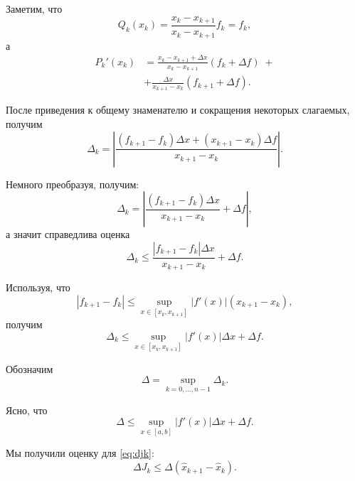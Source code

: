 \documentclass[10pt, twocolumn]{article}
\begin{document}
Заметим, что
\begin{equation*}
  Q_k(x_k) = \frac{x_k - x_{k + 1}}{x_k - x_{k + 1}} f_k  = f_k,
\end{equation*}
а
\begin{align*}
  P_k'(x_k) &= \frac{x_k - x_{k + 1} + \Delta x}{x_k - x_{k + 1}} (f_k + \Delta f) \; +\\
            &+ \frac{\Delta x}{x_{k + 1} - x_k} (f_{k + 1} + \Delta f).
\end{align*}

После приведения к общему знаменателю и сокращения некоторых слагаемых, получим
\begin{equation*}
  \Delta_k = \left| \frac{(f_{k + 1} - f_{k}) \Delta x + (x_{k + 1} - x_k) \Delta f}{x_{k + 1} - x_k} \right|.
\end{equation*}

Немного преобразуя, получим:
\begin{equation*}
  \Delta_k = \left| \frac{(f_{k + 1} - f_{k}) \Delta x}{x_{k + 1} - x_k} + \Delta f \right|,
\end{equation*}
а значит справедлива оценка
\begin{equation*}
  \Delta_k \leq \frac{\left| f_{k + 1} - f_{k} \right| \Delta x}{x_{k + 1} - x_k} + \Delta f.
\end{equation*}

Используя, что
\begin{equation*}
  \left| f_{k + 1} - f_{k} \right| \leq \sup \limits_{x \in [x_k, x_{k + 1}]} \left| f'(x) \right| (x_{k + 1} - x_k),
\end{equation*}
получим
\begin{equation*}
  \Delta_k \leq \sup \limits_{x \in [x_k, x_{k + 1}]} \left| f'(x) \right| \Delta x + \Delta f.
\end{equation*}

Обозначим
\begin{equation*}
  \Delta = \sup \limits_{k = 0, ..., n - 1} \Delta_k.
\end{equation*}

Ясно, что
\begin{equation} \label{eq:delta_error}
  \Delta \leq \sup \limits_{x \in [a, b]} \left| f'(x) \right| \Delta x + \Delta f.
\end{equation}

Мы получили оценку для \eqref{eq:djk}:
\begin{equation*}
  \Delta J_k \leq \Delta (\hat{x}_{k + 1} - \hat{x}_k).
\end{equation*}
\end{document}
